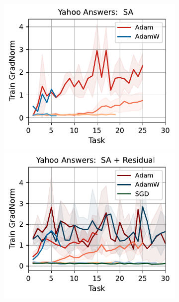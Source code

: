 \begin{figure}[htb!]
{\begin{figure}[htb!]
{        \includegraphics[width=\textwidth]{figs/GradNorm/nlp/attention/yahoo_answers_40.pdf}
        \includegraphics[width=\textwidth]{figs/GradNorm/nlp/attention_residual/yahoo_answers_40.pdf}
}
\end{figure}}
\end{figure}
